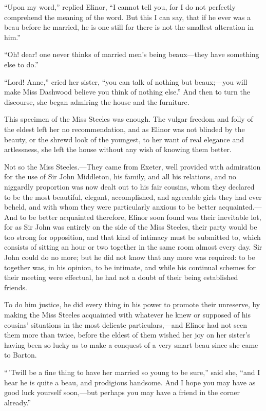 \documentclass{article}
\begin{document}
``Upon my word,'' replied Elinor, ``I cannot tell you,
for I do not perfectly comprehend the meaning of the word.
But this I can say, that if he ever was a beau before
he married, he is one still for there is not the smallest
alteration in him.''

``Oh! dear! one never thinks of married men's being
beaux---they have something else to do.''

``Lord! Anne,'' cried her sister, ``you can talk of
nothing but beaux;---you will make Miss Dashwood believe you
think of nothing else.'' And then to turn the discourse,
she began admiring the house and the furniture.

This specimen of the Miss Steeles was enough.
The vulgar freedom and folly of the eldest left
her no recommendation, and as Elinor was not blinded
by the beauty, or the shrewd look of the youngest,
to her want of real elegance and artlessness, she left
the house without any wish of knowing them better.

Not so the Miss Steeles.---They came from Exeter, well
provided with admiration for the use of Sir John Middleton,
his family, and all his relations, and no niggardly
proportion was now dealt out to his fair cousins, whom they
declared to be the most beautiful, elegant, accomplished,
and agreeable girls they had ever beheld, and with whom
they were particularly anxious to be better acquainted.---%
And to be better acquainted therefore, Elinor soon found
was their inevitable lot, for as Sir John was entirely
on the side of the Miss Steeles, their party would be
too strong for opposition, and that kind of intimacy
must be submitted to, which consists of sitting an hour
or two together in the same room almost every day.
Sir John could do no more; but he did not know that any
more was required: to be together was, in his opinion,
to be intimate, and while his continual schemes for their
meeting were effectual, he had not a doubt of their being
established friends.

To do him justice, he did every thing in his power
to promote their unreserve, by making the Miss Steeles
acquainted with whatever he knew or supposed of his cousins'
situations in the most delicate particulars,---and Elinor
had not seen them more than twice, before the eldest of
them wished her joy on her sister's having been so lucky
as to make a conquest of a very smart beau since she
came to Barton.

``\,'Twill be a fine thing to have her married so young
to be sure,'' said she, ``and I hear he is quite a beau,
and prodigious handsome.  And I hope you may have as good
luck yourself soon,---but perhaps you may have a friend
in the corner already.''
\end{document}
